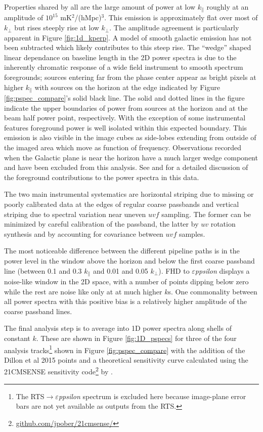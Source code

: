 \documentclass[twolcolumn,iop]{emulateapj}
\def\eppsilon{{\it $\varepsilon$ppsilon}}
\def\dilloncite{Dillon et al 2015 }
\begin{document}
Properties shared by all are the large amount of power at low $k_{\parallel}$ roughly at an amplitude of $10^{15}$ mK$^2$/(hMpc)$^3$. This emission is approximately flat over most of $k_{\perp}$ but rises steeply rise at low $k_\perp$. The amplitude agreement is particularly apparent in Figure \ref{fig:1d_kperp}. A model of smooth galactic emission has not been subtracted which likely contributes to this steep rise. The ``wedge'' shaped linear dependance on baseline length in the 2D power spectra is due to the inherently chromatic response of a wide field instrument to smooth spectrum foregrounds; sources entering far from the phase center appear as bright pixels at higher $k_\parallel$ with sources on the horizon at the edge indicated by Figure \ref{fig:pspec_compare}'s  solid black line. The solid and dotted lines in the figure indicate the upper boundaries of power from sources at the horizon and at the beam half power point, respectively.  With the exception of some instrumental features foreground power is well isolated within this expected boundary. This emission is also visible in the image cubes as side-lobes extending from outside of the imaged area which move as function of frequency.  Observations recorded when the Galactic plane is near the horizon have a much larger wedge component and have been excluded from this analysis. See \cite{2015ApJ...804...14T} and \cite{2015ApJ...807L..28T} for a detailed discussion of the foreground contributions to the power spectra in this data. 

The two main instrumental systematics are horizontal striping due to missing or poorly calibrated data at the edges of regular coarse passbands and vertical striping due to spectral variation near uneven $uvf$ sampling. The former can be minimized by careful calibration of the passband, the latter by $uv$ rotation synthesis and by accounting for covariance between $uvf$ samples. 

The most noticeable difference between the different pipeline paths is in the power level in the window above the horizon and below the first coarse passband line (between 0.1 and 0.3 $k_\parallel$ and 0.01 and 0.05 $k_\perp$). FHD to \eppsilon{} displays a noise-like window in the 2D space, with a number of points dipping below zero while the rest are noise like only at at much higher $k$s.  One commonality between all power spectra with this positive bias is a relatively higher amplitude of the coarse passband lines. 


The final analysis step is to average into 1D power spectra along shells of constant $k$. These are shown in Figure \ref{fig:1D_pspecs} for three of the four analysis tracks\footnote{The RTS$\to$\eppsilon{} spectrum is excluded here because image-plane error bars are not yet available as outputs from the RTS.} shown in Figure \ref{fig:pspec_compare} with the addition of the \dilloncite{} points and a theoretical sensitivity curve calculated using the 21CMSENSE sensitivity code\footnote{\url{github.com/jpober/21cmsense/}} by \cite{Pober:2014p10390}.
\end{document}
